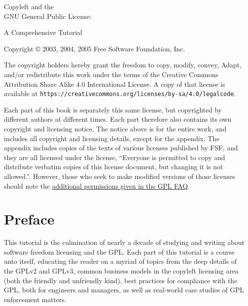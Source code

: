 \documentclass[10pt, letterpaper]{book}
\begin{document}
\pagestyle{plain}

\frontmatter

\begin{titlepage}

\begin{center}

{\Huge
{\sc Copyleft and the  \\

GNU General Public License:

\vspace{.25in}

A Comprehensive Tutorial
}}
\vfill

{\parindent 0in
Copyright \copyright{} 2003, 2004, 2005 \hspace{.2in} Free Software Foundation, Inc.

\vspace{.3in}

The copyright holders hereby grant the freedom to copy, modify, convey,
Adapt, and/or redistribute this work under the terms of the Creative Commons
Attribution Share Alike 4.0 International License.  A copy of that license is
available at \verb=https://creativecommons.org/licenses/by-sa/4.0/legalcode=.

Each part of this book is separately this same license, but copyrighted by
different authors at different times.  Each part therefore also contains its
own copyright and licensing notice.  The notice above is for the entire work,
and includes all copyright and licensing details, except for the appendix.
The appendix includes copies of the texts of various licenses published by
FSF, and they are all licensed under the license, ``Everyone is permitted to
copy and distribute verbatim copies of this license document, but changing it
is not allowed.''.  However, those who seek to make modified versions of
those licenses should note the
\href{https://www.gnu.org/licenses/gpl-faq.html#ModifyGPL}{additional
  permissions given in the GPL FAQ}.

}
\end{center}

\end{titlepage}

\tableofcontents

\chapter{Preface}

This tutorial is the culmination of nearly a decade of studying and writing
about software freedom licensing and the GPL\@.  Each part of this tutorial
is a course unto itself, educating the reader on a myriad of topics from the
deep details of the GPLv2 and GPLv3, common business models in the copyleft
licensing area (both the friendly and unfriendly kind), best practices for
compliance with the GPL, both for engineers and managers, as well as
real-world case studies of GPL enforcement matters.
\end{document}
